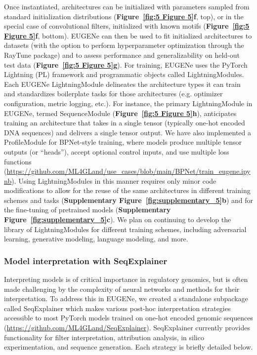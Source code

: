 Once instantiated, architectures can be initialized with parameters sampled from standard initialization distributions (\textbf{Figure~\ref{fig:5 Figure 5}\textbf{f}}, top), or in the special case of convolutional filters, initialized with known motifs\cite{Quang2016-ll,Janssens2022-vy} (\textbf{Figure~\ref{fig:5 Figure 5}\textbf{f}}, bottom). EUGENe can then be used to fit initialized architectures to datasets (with the option to perform hyperparameter optimization through the RayTune package\cite{Moritz2017-tm}) and to assess performance and generalizability on held-out test data (\textbf{Figure~\ref{fig:5 Figure 5}\textbf{g}}). For training, EUGENe uses the PyTorch Lightning (PL) framework\cite{Falcon2020-zq} and programmatic objects called LightningModules. Each EUGENe LightningModule delineates the architecture types it can train and standardizes boilerplate tasks for those architectures (e.g. optimizer configuration, metric logging, etc.). For instance, the primary LightningModule in EUGENe, termed SequenceModule (\textbf{Figure~\ref{fig:5 Figure 5}\textbf{h}}), anticipates training an architecture that takes in a single tensor (typically one-hot encoded DNA sequences) and delivers a single tensor output. We have also implemented a ProfileModule for BPNet-style\cite{Avsec2021-sw} training, where models produce multiple tensor outputs (or “heads”), accept optional control inputs, and use multiple loss functions (\url{https://github.com/ML4GLand/use_cases/blob/main/BPNet/train_eugene.ipynb}). Using LightningModules in this manner requires only minor code modifications to allow for the reuse of the same architectures in different training schemes and tasks (\textbf{Supplementary Figure~\ref{fig:supplementary_5}\textbf{b}}) and for the fine-tuning of pretrained models (\textbf{Supplementary Figure~\ref{fig:supplementary_5}\textbf{c}}). We plan on continuing to develop the library of LightningModules for different training schemes, including adversarial learning\cite{Koo2019-dw}, generative modeling\cite{Taskiran2022-zj}, language modeling\cite{Ji2021-mj}, and more.

\subsubsection{Model interpretation with SeqExplainer}

Interpreting models is of critical importance in regulatory genomics\cite{Koo2020-vz,Novakovsky2022-ft,Talukder2021-wj}, but is often made challenging by the complexity of neural networks and methods for their interpretation. To address this in EUGENe, we created a standalone subpackage called SeqExplainer which makes various post-hoc interpretation strategies accessible to most PyTorch models trained on one-hot encoded genomic sequences (\url{https://github.com/ML4GLand/SeqExplainer}). SeqExplainer currently provides functionality for filter interpretation, attribution analysis, in silico experimentation, and sequence generation. Each strategy is briefly detailed below.

